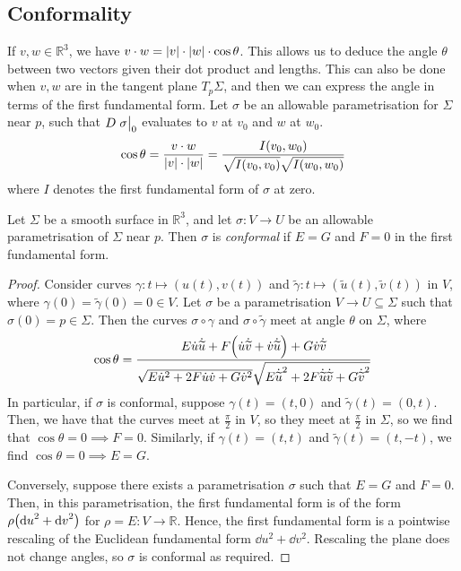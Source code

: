 \subsection{Conformality}
If \( v,w \in \mathbb R^3 \), we have \( v \cdot w = \abs{v} \cdot \abs{w} \cdot \cos\theta \).
This allows us to deduce the angle \( \theta \) between two vectors given their dot product and lengths.
This can also be done when \( v,w \) are in the tangent plane \( T_p \Sigma \), and then we can express the angle in terms of the first fundamental form.
Let \( \sigma \) be an allowable parametrisation for \( \Sigma \) near \( p \), such that \( D\eval{\sigma}_0 \) evaluates to \( v \) at \( v_0 \) and \( w \) at \( w_0 \).
\[
	\cos \theta = \frac{v \cdot w}{\abs{v} \cdot \abs{w}} = \frac{I(v_0, w_0)}{\sqrt{I(v_0,v_0)} \sqrt{I(w_0,w_0)}}
\]
where \( I \) denotes the first fundamental form of \( \sigma \) at zero.
\begin{lemma}
	Let \( \Sigma \) be a smooth surface in \( \mathbb R^3 \), and let \( \sigma \colon V \to U \) be an allowable parametrisation of \( \Sigma \) near \( p \).
	Then \( \sigma \) is \textit{conformal} if \( E = G \) and \( F = 0 \) in the first fundamental form.
\end{lemma}
\begin{proof}
	Consider curves \( \gamma \colon t \mapsto (u(t), v(t)) \) and \( \widetilde \gamma \colon t \mapsto (\widetilde u(t), \widetilde v(t)) \) in \( V \), where \( \gamma(0) = \widetilde \gamma(0) = 0 \in V \).
	Let \( \sigma \) be a parametrisation \( V \to U \subseteq \Sigma \) such that \( \sigma(0) = p \in \Sigma \).
	Then the curves \( \sigma \circ \gamma \) and \( \sigma \circ \widetilde \gamma \) meet at angle \( \theta \) on \( \Sigma \), where
	\[
		\cos \theta = \frac{E \dot u \dot {\widetilde u} + F \qty(\dot u \dot{\widetilde v} + \dot v \dot{\widetilde u}) + G \dot v \dot{\widetilde v}}{\sqrt{E \dot u^2 + 2F \dot u \dot v + G \dot v^2} \sqrt{E \dot{\widetilde u}^2 + 2F \dot{\widetilde u} \dot {\widetilde v} + G \dot{\widetilde v}^2}}
	\]
	In particular, if \( \sigma \) is conformal, suppose \( \gamma(t) = (t,0) \) and \( \widetilde \gamma(t) = (0,t) \).
	Then, we have that the curves meet at \( \frac{\pi}{2} \) in \( V \), so they meet at \( \frac{\pi}{2} \) in \( \Sigma \), so we find that \( \cos \theta = 0 \implies F = 0 \).
	Similarly, if \( \gamma(t) = (t,t) \) and \( \widetilde \gamma(t) = (t,-t) \), we find \( \cos \theta = 0 \implies E = G \).

	Conversely, suppose there exists a parametrisation \( \sigma \) such that \( E = G \) and \( F = 0 \).
	Then, in this parametrisation, the first fundamental form is of the form \( \rho \qty(\dd{u}^2 + \dd{v}^2) \) for \( \rho = E \colon V \to \mathbb R \).
	Hence, the first fundamental form is a pointwise rescaling of the Euclidean fundamental form \( \dd{u}^2 + \dd{v}^2 \).
	Rescaling the plane does not change angles, so \( \sigma \) is conformal as required.
\end{proof}
